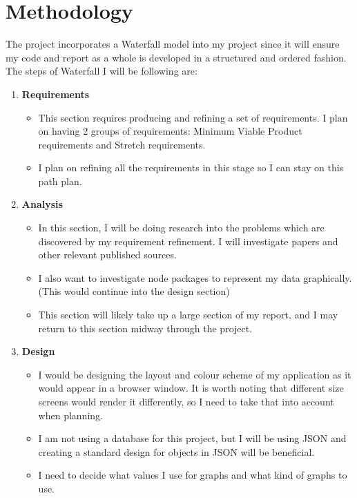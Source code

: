 \documentclass{report}
\begin{document}
\chapter{Methodology}
The project incorporates a Waterfall model into my project since it will ensure my code and report as a whole is developed in a structured and ordered fashion.\\
The steps of Waterfall I will be following are:
\begin{enumerate}
    \item \textbf{\large{Requirements}}
    \begin{itemize}
        \item This section requires producing and refining a set of requirements. I plan on having 2 groups of requirements: Minimum Viable Product requirements and Stretch requirements.
        \item I plan on refining all the requirements in this stage so I can stay on this path plan.
    \end{itemize}
    \item \textbf{\large{Analysis}}
    \begin{itemize}
        \item In this section, I will be doing research into the problems which are discovered by my requirement refinement. I will investigate papers and other relevant published sources.
        \item I also want to investigate node packages to represent my data graphically. (This would continue into the design section)
        \item This section will likely take up a large section of my report, and I may return to this section midway through the project.
    \end{itemize}
    \item \textbf{\large{Design}}
    \begin{itemize}
        \item I would be designing the layout and colour scheme of my application as it would appear in a browser window. It is worth noting that different size screens would render it differently, so I need to take that into account when planning.
        \item I am not using a database for this project, but I will be using JSON and creating a standard design for objects in JSON will be beneficial.
        \item I need to decide what values I use for graphs and what kind of graphs to use.
    \end{itemize}

\end{enumerate}
\end{document}
